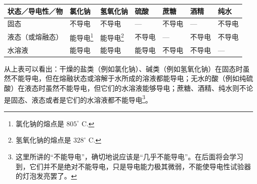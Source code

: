 {\def\LTcaptype{none} %
\begin{longtable}[]{@{}
  >{\raggedright\arraybackslash}p{}
  >{\raggedright\arraybackslash}p{}
  >{\raggedright\arraybackslash}p{}
  >{\raggedright\arraybackslash}p{}
  >{\raggedright\arraybackslash}p{}
  >{\raggedright\arraybackslash}p{}
  >{\raggedright\arraybackslash}p{}@{}}
\toprule\noalign{}
\begin{minipage}[b]{\linewidth}\raggedright
状态／导电性／物
\end{minipage} & \begin{minipage}[b]{\linewidth}\raggedright
氯化钠
\end{minipage} & \begin{minipage}[b]{\linewidth}\raggedright
氢氧化钠
\end{minipage} & \begin{minipage}[b]{\linewidth}\raggedright
硫酸
\end{minipage} & \begin{minipage}[b]{\linewidth}\raggedright
蔗糖
\end{minipage} & \begin{minipage}[b]{\linewidth}\raggedright
酒精
\end{minipage} & \begin{minipage}[b]{\linewidth}\raggedright
纯水
\end{minipage} \\
\midrule\noalign{}
\endhead
\bottomrule\noalign{}
\endlastfoot
固态 & 不导电 & 不导电 & --- & 不导电 & --- & 不导电 \\
液态（或熔融态） & 能导电\footnote{氯化钠的熔点是 \(805^{\circ}\) C.} &
能导电\footnote{氢氧化钠的熔点是 \(328^{\circ}\) C.} & 不导电 & --- &
不导电 & 不导电 \\
水溶液 & 能导电 & 能导电 & 能导电 & 不导电 & 不导电 & --- \\
\end{longtable}
}

从上表可以看出：干燥的盐类（例如氯化钠）、碱类（例如氢氧化钠）在固态时虽然不能导电，但在熔融状态或溶解于水所成的溶液都能导电；无水的酸（例如纯硫酸）在液态时虽然不能导电，但它们的水溶液能够导电；蔗糖、酒精、纯水则不论是固态、液态或者是它们的水溶液都不能导电\footnote{这里所讲的``不能导电''，确切地说应该是``几乎不能导电''。在后面将会学习到，它们并不是绝对不能导电，只是导电能力极其微弱，不能使导电性试验器的灯泡发亮罢了。}。

